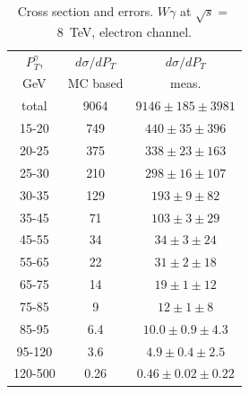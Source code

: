 \begin{table}[h]
  \scriptsize
  \begin{center}
  \caption{Cross section and errors. $W\gamma$ at $\sqrt{s}=$8~TeV, electron channel.}
  \begin{tabular}{|c|c|c|}
    $P_T^{\gamma}$, & $d\sigma/dP_{T}$ &$d\sigma/dP_{T}$ \\ 
    GeV & MC based &    meas.       \\ \hline
    total & 9064 & $9146 \pm 185 \pm 3981$ \\ \hline
    15-20 & 749 & $440 \pm 35 \pm 396$ \\ \hline
    20-25 & 375 & $338 \pm 23 \pm 163$ \\ \hline
    25-30 & 210 & $298 \pm 16 \pm 107$ \\ \hline
    30-35 & 129 & $193 \pm 9 \pm 82$ \\ \hline
    35-45 & 71 & $103 \pm 3 \pm 29$ \\ \hline
    45-55 & 34 & $34 \pm 3 \pm 24$ \\ \hline
    55-65 & 22 & $31 \pm 2 \pm 18$ \\ \hline
    65-75 & 14 & $19 \pm 1 \pm 12$ \\ \hline
    75-85 & 9 & $12 \pm 1 \pm 8$ \\ \hline
    85-95 & 6.4 & $10.0 \pm 0.9 \pm 4.3$ \\ \hline
    95-120 & 3.6 & $4.9 \pm 0.4 \pm 2.5$ \\ \hline
    120-500 & 0.26 & $0.46 \pm 0.02 \pm 0.22$ \\ \hline
  \end{tabular}
  \label{tab:sc_mc_vs_meas_ELECTRON_WGamma}
  \end{center}
\end{table}
 
